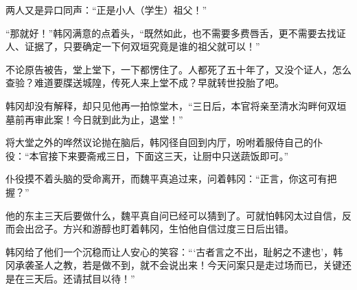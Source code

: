两人又是异口同声：“正是小人（学生）祖父！”

“那就好！”韩冈满意的点着头，“既然如此，也不需要多费唇舌，更不需要去找证人、证据了，只要确定一下何双垣究竟是谁的祖父就可以！”

不论原告被告，堂上堂下，一下都愣住了。人都死了五十年了，又没个证人，怎么查验？难道要牒送城隍，传死人来上堂不成？早就转世投胎了吧。

韩冈却没有解释，却只见他再一拍惊堂木，“三日后，本官将亲至清水沟畔何双垣墓前再审此案！今日就到此为止，退堂！”

将大堂之外的哗然议论抛在脑后，韩冈径自回到内厅，吩咐着服侍自己的仆役：“本官接下来要斋戒三日，下面这三天，让厨中只送蔬饭即可。”

仆役摸不着头脑的受命离开，而魏平真追过来，问着韩冈：“正言，你这可有把握？”

他的东主三天后要做什么，魏平真自问已经可以猜到了。可就怕韩冈太过自信，反而会出岔子。方兴和游醇也盯着韩冈，生怕他自信过度三日后出错。

韩冈给了他们一个沉稳而让人安心的笑容：“‘古者言之不出，耻躬之不逮也’，韩冈承袭圣人之教，若是做不到，就不会说出来！今天问案只是走过场而已，关键还是在三天后。还请拭目以待！”

